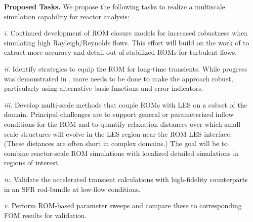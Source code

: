 \noindent
{\bf Proposed Tasks.}
We propose the following tasks to realize a multiscale simulation
capability for reactor analysis:
\begin{description}
%
\item{\em i.}
Continued development of ROM closure models for increased robustness when
simulating high Rayleigh/Reynolds flows.  This effort will build on the work of
\cite{kaneko22a,kaneko22,tsai22a} to extract more accuracy and detail out of
stabilized ROMs for turbulent flows.
%
\item{\em ii.}
Identify strategies to equip the ROM for long-time transients.  While progress
was demonstrated in \cite{kaneko20a}, more needs to be done to make the
approach robust, particularly using alternative basis functions and error
indicators.
%
\item{\em iii.}
Develop multi-scale methods that couple ROMs with LES on a subset of
the domain.  Principal challenges are to support general or
parameterized inflow conditions for the ROM and to quantify relaxation
distances over which small scale structures will evolve in the LES region
near the ROM-LES interface.
(These distances are often short in complex domains.)
The goal will be to combine reactor-scale ROM simulations with localized
detailed simulations in regions of interest.
%
\item{\em iv.}
Validate the accelerated transient calculations with high-fidelity counterparts
in an SFR rod-bundle at low-flow conditions.
%
\item{\em v.}
Perform ROM-based parameter sweeps and compare these to corresponding
FOM results for validation.
%
\end{description}




















